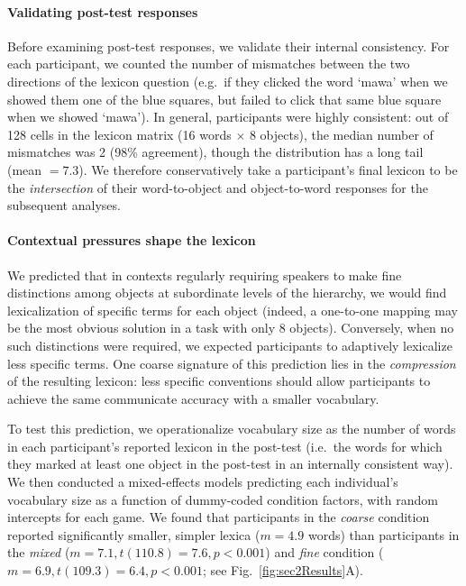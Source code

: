 \paragraph{Validating post-test responses}

Before examining post-test responses, we validate their internal consistency.
For each participant, we counted the number of mismatches between the two directions of the lexicon question (e.g.\ if they clicked the word `mawa' when we showed them one of the blue squares, but failed to click that same blue square when we showed `mawa'). 
In general, participants were highly consistent: out of 128 cells in the lexicon matrix (16 words $\times$ 8 objects), the median number of mismatches was 2 (98\% agreement), though the distribution has a long tail (mean $= 7.3$). 
We therefore conservatively take a participant's final lexicon to be the \emph{intersection} of their word-to-object and object-to-word responses for the subsequent analyses.

\paragraph{Contextual pressures shape the lexicon}

We predicted that in contexts regularly requiring speakers to make fine distinctions among objects at subordinate levels of the hierarchy, we would find lexicalization of specific terms for each object (indeed, a one-to-one mapping may be the most obvious solution in a task with only 8 objects). 
Conversely, when no such distinctions were required, we expected participants to adaptively lexicalize less specific terms.
One coarse signature of this prediction lies in the \emph{compression} of the resulting lexicon: less specific conventions should allow participants to achieve the same communicate accuracy with a smaller vocabulary.

To test this prediction, we operationalize vocabulary size as the number of words in each participant's reported lexicon in the post-test (i.e.\ the words for which they marked at least one object in the post-test in an internally consistent way). 
We then conducted a mixed-effects models predicting each individual's vocabulary size as a function of dummy-coded condition factors, with random intercepts for each game. 
We found that participants in the \emph{coarse} condition reported significantly smaller, simpler lexica ($m = 4.9$ words) than participants in the \emph{mixed} ($m=7.1, t(110.8)=7.6, p < 0.001$) and \emph{fine} condition ($m = 6.9, t(109.3) = 6.4, p < 0.001$; see Fig.\ \ref{fig:sec2Results}A). 

